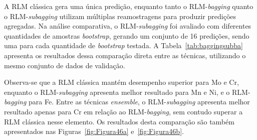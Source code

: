 
A RLM clássica gera uma única predição, enquanto tanto o RLM-\textit{bagging} quanto o RLM-\textit{subagging} utilizam múltiplas reamostragens para produzir predições agregadas. Na análise comparativa, o RLM-\textit{subagging} foi avaliado com diferentes quantidades de amostras \textit{bootstrap}, gerando um conjunto de 16 predições, sendo uma para cada quantidade de \textit{bootstrap} testada. A Tabela~\ref{tab:baggingsubba} apresenta os resultados dessa comparação direta entre as técnicas, utilizando o mesmo conjunto de dados de validação. 

Observa-se que a RLM clássica mantém desempenho superior para Mo e Cr, enquanto o RLM-\textit{subagging} apresenta melhor resultado para Mn e Ni, e o RLM-\textit{bagging} para Fe. Entre as técnicas \textit{ensemble}, o RLM-\textit{subagging} apresenta melhor resultado apenas para Cr em relação ao RLM-\textit{bagging}, sem contudo superar a RLM clássica nesse elemento. Os resultados desta comparação são também apresentados nas Figuras~\ref{fig:Figura46a} e~\ref{fig:Figura46b}.


% 
%

